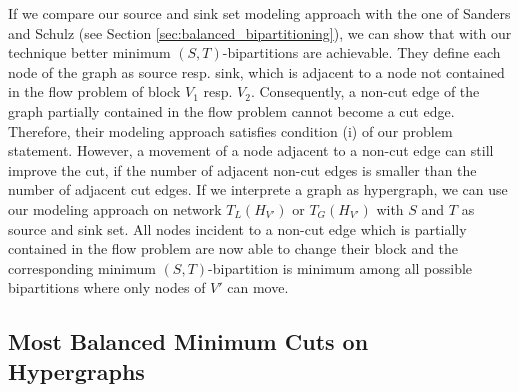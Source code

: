 \normalfont\normalsize
If we compare our source and sink set modeling approach with the one of Sanders and Schulz
\cite{sanders2011engineering} (see Section \ref{sec:balanced_bipartitioning}), we can show that
with our technique better minimum $(S,T)$-bipartitions are achievable. They define each node of the graph
as source resp. sink, which is adjacent to a node not contained in the flow problem of block $V_1$
resp. $V_2$. Consequently, a non-cut edge of the graph partially contained in the flow problem
cannot become a cut edge. Therefore, their modeling approach satisfies condition (i) of our problem
statement. However, a movement of a node adjacent to a non-cut edge can still improve the cut, if
the number of adjacent non-cut edges is smaller than the number of adjacent cut edges. 
If we interprete a graph as hypergraph, we can use our modeling 
approach on network $T_L(H_{V'})$ or $T_G(H_{V'})$ with $S$ and $T$ as source and sink set. 
All nodes incident to a non-cut edge which is partially contained in the flow problem
are now able to change their block and the corresponding minimum $(S,T)$-bipartition is minimum
among all possible bipartitions where only nodes of $V'$ can move.


\subsection{Most Balanced Minimum Cuts on Hypergraphs}
\label{sec:mbmc_hypergraphs}

